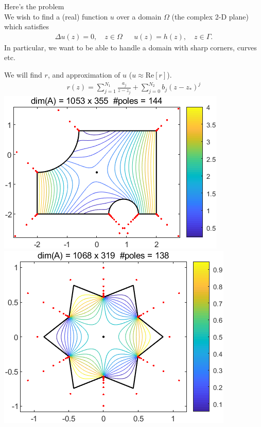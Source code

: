 \documentclass{seminar}
\begin{document}
\begin{slide} %
\large Here's the problem\\

\small
We wish to find a (real) function $u$ over a domain $\Omega$ (the complex 2-D plane) which satisfies
\begin{align*}
\Delta u(z)=0, \quad z\in \Omega &&
u(z)=h(z), \quad z\in \Gamma .
\end{align*}
In particular, we want to be able to handle a domain with sharp corners, curves etc. 

We will find $r$, and approximation of $u$ ($u\approx\mathrm{Re}[r]$).
\begin{align*}
r(z)= \sum_{j=1}^{N_1} \frac{a_j}{z-z_j} + \sum_{j=0}^{N_2} b_j (z-z_*)^j
\end{align*}
\includegraphics[scale=.45]{./PNG/Howell_1994} $\quad$
\includegraphics[scale=.4]{./PNG/snowflake}  $\quad$

\end{slide}
\end{document}
